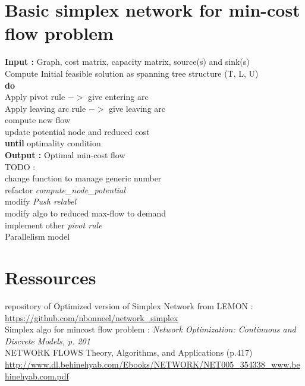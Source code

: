 \documentclass{article}
\newcommand\tab[1][0.5cm]{\hspace*{#1}}
\begin{document}
\section*{Basic simplex network for min-cost flow problem}
\textbf{Input : } Graph, cost matrix, capacity matrix, source(s) and sink(s)\\
Compute Initial feasible solution as spanning tree structure (T, L, U)\\
\textbf{do}\\
\tab Apply pivot rule $->$ give entering arc\\
\tab Apply leaving arc rule $->$ give leaving arc\\
\tab compute new flow\\
\tab update potential node and reduced cost\\
\textbf{until} optimality condition\\
\textbf{Output : } Optimal min-cost flow
\vspace{15px}\\
TODO : \\
change function to manage generic number\\
refactor \textit{compute\_node\_potential}\\
modify \textit{Push relabel}\\
modify algo to reduced max-flow to demand\\
implement other \textit{pivot rule}\\
Parallelism model\\



\newpage

\section*{Ressources}

\noindent repository of Optimized version of Simplex Network from LEMON : \url{https://github.com/nbonneel/network_simplex}\\

\noindent Simplex algo for mincost flow problem : \textit{Network Optimization: Continuous and Discrete Models, p. 201}\\

\noindent NETWORK FLOWS Theory, Algorithms, and Applications (p.417) \url{http://www.dl.behinehyab.com/Ebooks/NETWORK/NET005_354338_www.behinehyab.com.pdf}
\end{document}
